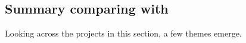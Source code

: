 






\subsection{Summary comparing with \Make}

Looking across the projects in this section, a few themes emerge.

